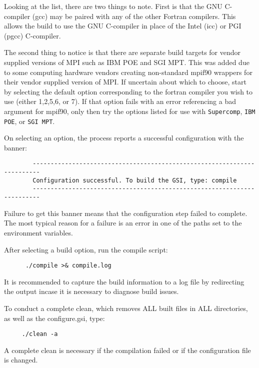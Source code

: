 Looking at the list, there are two things to note. First is that the GNU C-compiler (gcc) may be 
paired with any of the other Fortran compilers. This allows the build to use the GNU C-compiler 
in place of the Intel (icc) or PGI (pgcc) C-compiler.

The second thing to notice is that there are separate build targets for vendor supplied versions 
of MPI such as IBM POE and SGI MPT. This was added due to some computing hardware vendors 
creating non-standard mpif90 wrappers for their vendor supplied version of MPI. If uncertain about 
which to choose, start by selecting the default option corresponding to the fortran compiler you wish 
to use (either 1,2,5,6, or 7). If that option fails with an error referencing a bad argument for mpif90,
only then try the options listed for use with \verb|Supercomp|, \verb|IBM POE|, or \verb|SGI MPT|.

On selecting an option, the process reports a successful configuration with the banner:
\begin{scriptsize}
\begin{verbatim}
        ------------------------------------------------------------------------ 
        Configuration successful. To build the GSI, type: compile 
        ------------------------------------------------------------------------
\end{verbatim}
\end{scriptsize}
Failure to get this banner means that the configuration step failed to complete. The most typical reason for a failure is an error in one of the paths set to the environment variables.

After selecting a build option, run the compile script:
\begin{small}
\begin{verbatim}
      ./compile >& compile.log
\end{verbatim}
\end{small}
It is recommended to capture the build information to a log file by redirecting the output incase it is necessary to diagnose build issues. 

To conduct a complete clean, which removes ALL built files in ALL directories, as well as the configure.gsi, type:
\begin{small}
\begin{verbatim}
     ./clean -a
\end{verbatim}
\end{small}
A complete clean is necessary if the compilation failed or if the configuration file is changed.

